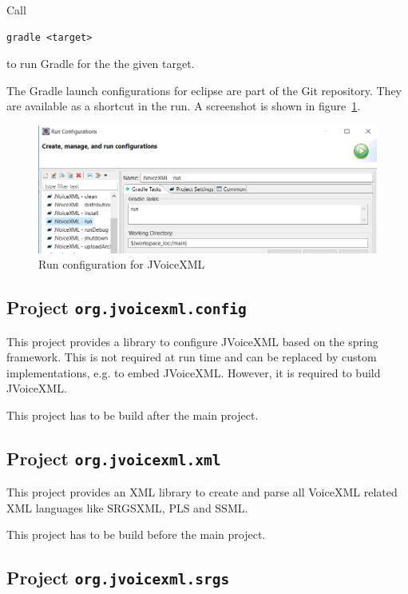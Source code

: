 \documentclass[11pt,a4paper]{article}
\begin{document}
Call
\begin{lstlisting}
gradle <target>
\end{lstlisting}
to run Gradle for the the given target.

The Gradle launch configurations for eclipse are part of the Git repository. They
are available as a shortcut in the run. A screenshot is shown in figure~\ref{fig:eclipse-launch}.
\begin{figure}
\includegraphics[width=\linewidth]{eclipse-launch.png}
\caption{Run configuration for JVoiceXML}
\label{fig:eclipse-launch}
\end{figure}

\subsection{Project \texttt{org.jvoicexml.config}}
\label{sec:org.jvoicexml.config}

This project provides a library to configure JVoiceXML based on the spring
framework.
This is not required at run time and can be replaced by custom
implementations, e.g. to embed JVoiceXML. However, it is required to build
JVoiceXML.

This project has to be build after the main project.

\subsection{Project \texttt{org.jvoicexml.xml}}
\label{sec:org.jvoicexml.xml}

This project provides an XML library to create and parse all VoiceXML related
XML languages like SRGSXML, PLS and SSML.

This project has to be build before the main project.

\subsection{Project \texttt{org.jvoicexml.srgs}}
\label{sec:org.jvoicexml.srgs}
\end{document}
